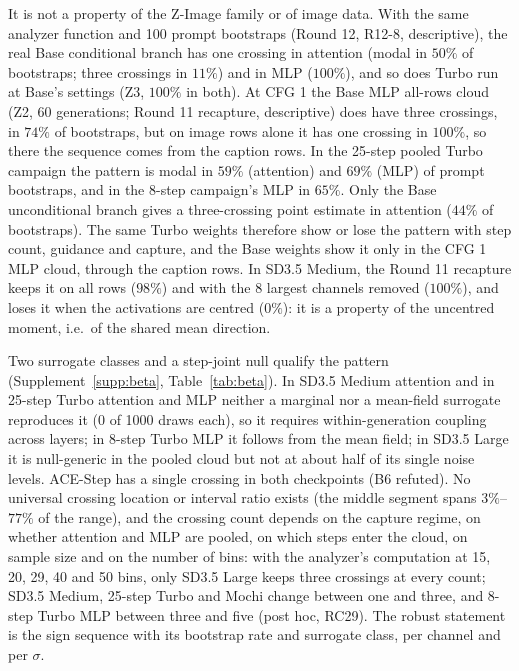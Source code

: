 \documentclass[11pt]{article}
\begin{document}
It is not a property of the Z-Image family or of image data. With the same analyzer function and 100 prompt bootstraps (Round 12, R12-8, descriptive), the real Base conditional branch has one crossing in attention (modal in $50\%$ of bootstraps; three crossings in $11\%$) and in MLP ($100\%$), and so does Turbo run at Base's settings (Z3, $100\%$ in both). At CFG 1 the Base MLP all-rows cloud (Z2, 60 generations; Round 11 recapture, descriptive) does have three crossings, in $74\%$ of bootstraps, but on image rows alone it has one crossing in $100\%$, so there the sequence comes from the caption rows. In the 25-step pooled Turbo campaign the pattern is modal in $59\%$ (attention) and $69\%$ (MLP) of prompt bootstraps, and in the 8-step campaign's MLP in $65\%$. Only the Base unconditional branch gives a three-crossing point estimate in attention ($44\%$ of bootstraps). The same Turbo weights therefore show or lose the pattern with step count, guidance and capture, and the Base weights show it only in the CFG 1 MLP cloud, through the caption rows. In SD3.5 Medium, the Round 11 recapture keeps it on all rows ($98\%$) and with the 8 largest channels removed ($100\%$), and loses it when the activations are centred ($0\%$): it is a property of the uncentred moment, i.e.\ of the shared mean direction.

Two surrogate classes and a step-joint null qualify the pattern (Supplement~\ref{supp:beta}, Table~\ref{tab:beta}). In SD3.5 Medium attention and in 25-step Turbo attention and MLP neither a marginal nor a mean-field surrogate reproduces it (0 of 1000 draws each), so it requires within-generation coupling across layers; in 8-step Turbo MLP it follows from the mean field; in SD3.5 Large it is null-generic in the pooled cloud but not at about half of its single noise levels. ACE-Step has a single crossing in both checkpoints (B6 refuted). No universal crossing location or interval ratio exists (the middle segment spans $3\%$--$77\%$ of the range), and the crossing count depends on the capture regime, on whether attention and MLP are pooled, on which steps enter the cloud, on sample size and on the number of bins: with the analyzer's computation at 15, 20, 29, 40 and 50 bins, only SD3.5 Large keeps three crossings at every count; SD3.5 Medium, 25-step Turbo and Mochi change between one and three, and 8-step Turbo MLP between three and five (post hoc, RC29). The robust statement is the sign sequence with its bootstrap rate and surrogate class, per channel and per $\sigma$.
\end{document}
